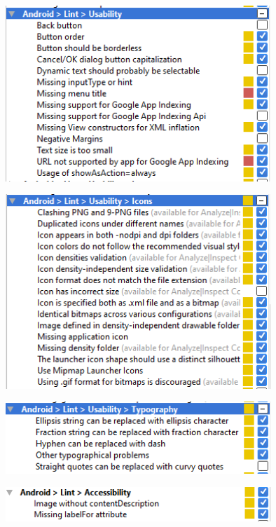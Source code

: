 \begin{figure}[H]
  		\centering
      	\includegraphics[width=100mm]{Capture7}	      	
  		\caption{}
\end{figure}

\begin{figure}[H]
  		\centering
      	\includegraphics[width=100mm]{Capture8}	      	
  		\caption{}
\end{figure}

\begin{figure}[H]
  		\centering
      	\includegraphics[width=100mm]{Capture9}	      	
  		\caption{}
\end{figure}

\begin{figure}[H]
  		\centering
      	\includegraphics[width=100mm]{Capture10}	      	
  		\caption{}
\end{figure}

